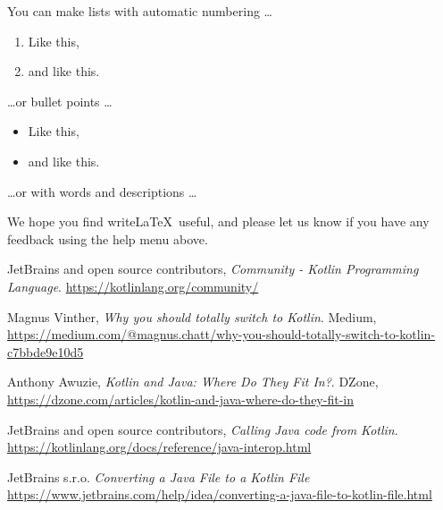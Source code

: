 \documentclass[a4paper]{article}
\begin{document}
You can make lists with automatic numbering \dots

\begin{enumerate}
    \item Like this,
    \item and like this.
\end{enumerate}
\dots or bullet points \dots
\begin{itemize}
    \item Like this,
    \item and like this.
\end{itemize}
\dots or with words and descriptions \dots


We hope you find write\LaTeX\ useful, and please let us know if you have any feedback using the help menu above.

\begin{thebibliography}{999}
\raggedright

    JetBrains and open source contributors,
    \emph{Community - Kotlin Programming Language}.
    \url{https://kotlinlang.org/community/}

    Magnus Vinther,
    \emph{Why you should totally switch to Kotlin}. Medium,
    \url{https://medium.com/@magnus.chatt/why-you-should-totally-switch-to-kotlin-c7bbde9e10d5}

    Anthony Awuzie,
    \emph{Kotlin and Java: Where Do They Fit In?}. DZone,
    \url{https://dzone.com/articles/kotlin-and-java-where-do-they-fit-in}

    JetBrains and open source contributors,
    \emph{Calling Java code from Kotlin}.
    \url{https://kotlinlang.org/docs/reference/java-interop.html}

    JetBrains s.r.o.
    \emph{Converting a Java File to a Kotlin File}
    \url{https://www.jetbrains.com/help/idea/converting-a-java-file-to-kotlin-file.html}

\end{thebibliography}
\end{document}
